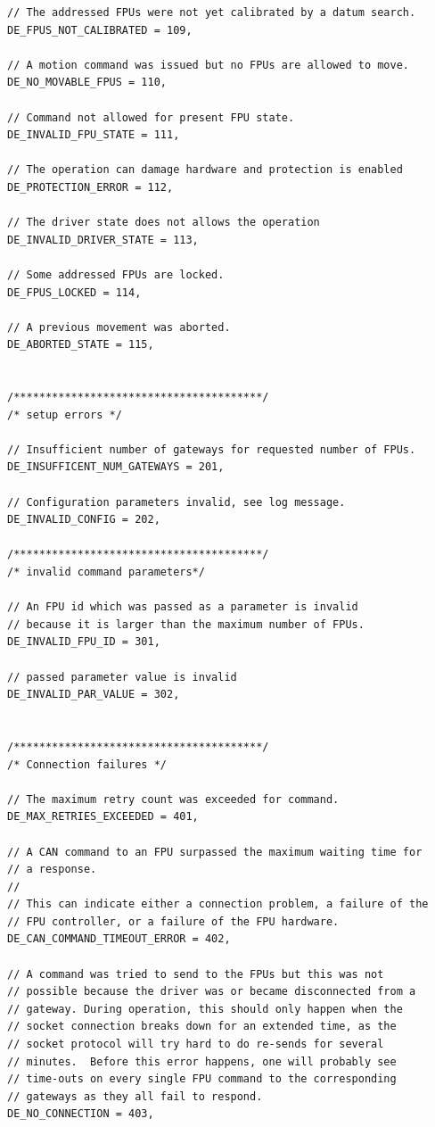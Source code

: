 \documentclass[11pt,a4paper]{scrartcl}
\begin{document}
\begin{verbatim}
// The addressed FPUs were not yet calibrated by a datum search.
DE_FPUS_NOT_CALIBRATED = 109,

// A motion command was issued but no FPUs are allowed to move.
DE_NO_MOVABLE_FPUS = 110,

// Command not allowed for present FPU state.
DE_INVALID_FPU_STATE = 111,

// The operation can damage hardware and protection is enabled
DE_PROTECTION_ERROR = 112,

// The driver state does not allows the operation
DE_INVALID_DRIVER_STATE = 113,

// Some addressed FPUs are locked.
DE_FPUS_LOCKED = 114,

// A previous movement was aborted.
DE_ABORTED_STATE = 115,


/***************************************/
/* setup errors */

// Insufficient number of gateways for requested number of FPUs.
DE_INSUFFICENT_NUM_GATEWAYS = 201,

// Configuration parameters invalid, see log message.
DE_INVALID_CONFIG = 202,

/***************************************/
/* invalid command parameters*/

// An FPU id which was passed as a parameter is invalid
// because it is larger than the maximum number of FPUs.
DE_INVALID_FPU_ID = 301,

// passed parameter value is invalid
DE_INVALID_PAR_VALUE = 302,


/***************************************/
/* Connection failures */

// The maximum retry count was exceeded for command.
DE_MAX_RETRIES_EXCEEDED = 401,

// A CAN command to an FPU surpassed the maximum waiting time for
// a response.
//
// This can indicate either a connection problem, a failure of the
// FPU controller, or a failure of the FPU hardware.
DE_CAN_COMMAND_TIMEOUT_ERROR = 402,

// A command was tried to send to the FPUs but this was not
// possible because the driver was or became disconnected from a
// gateway. During operation, this should only happen when the
// socket connection breaks down for an extended time, as the
// socket protocol will try hard to do re-sends for several
// minutes.  Before this error happens, one will probably see
// time-outs on every single FPU command to the corresponding
// gateways as they all fail to respond.
DE_NO_CONNECTION = 403,



\end{verbatim}
\end{document}
